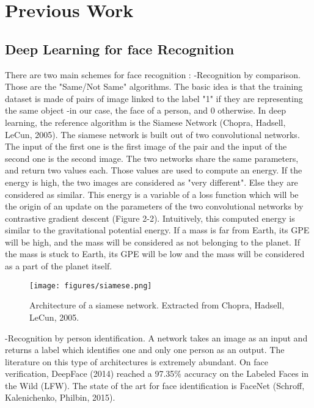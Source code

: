\section{Previous Work}
\subsection{Deep Learning for face Recognition}
There are two main schemes for face recognition :\newline
-Recognition by comparison. Those are the "Same/Not Same" algorithms. The basic idea is that the training dataset is made of pairs of image linked to the label "1" if they are representing the same object -in our case, the face of a person, and 0 otherwise. In deep learning, the reference algorithm is the Siamese Network (Chopra, Hadsell, LeCun, 2005). The siamese network is built out of two convolutional networks. The input of the first one is the first image of the pair and the input of the second one is the second image. The two networks share the same parameters, and return two values each. Those values are used to compute an energy. If the energy is high, the two images are considered as "very different". Else they are considered as similar. This energy is a variable of a loss function which will be the origin of an update on the parameters of the two convolutional networks by contrastive gradient descent (Figure 2-2). Intuitively, this computed energy is similar to the gravitational potential energy. If a mass is far from Earth, its GPE will be high, and the mass will be considered as not belonging to the planet. If the mass is stuck to Earth, its GPE will be low and the mass will be considered as a part of the planet itself.


\begin{figure}[t]
  \centering
  \texttt{[image: figures/siamese.png]}  
  \caption[Architecture of a siamese network. Extracted from Chopra, Hadsell, LeCun, 2005.]{Architecture of a siamese network. Extracted from Chopra, Hadsell, LeCun, 2005.}
  \label{fig:Siamese}
\end{figure}

-Recognition by person identification. A network takes an image as an input and returns a label which identifies one and only one person as an output. The literature on this type of architectures is extremely abundant. On face verification, DeepFace (2014) reached a 97.35\% accuracy on the Labeled Faces in the Wild (LFW). The state of the art for face identification is FaceNet (Schroff, Kalenichenko, Philbin, 2015).

